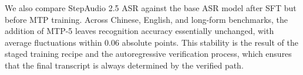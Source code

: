 \documentclass{llmxive}
\begin{document}
We also compare StepAudio 2.5 ASR against the base ASR model after SFT but before MTP training. Across Chinese, English, and long-form benchmarks, the addition of MTP-5 leaves recognition accuracy essentially unchanged, with average fluctuations within 0.06 absolute points. This stability is the result of the staged training recipe and the autoregressive verification process, which ensures that the final transcript is always determined by the verified path.


\end{document}
